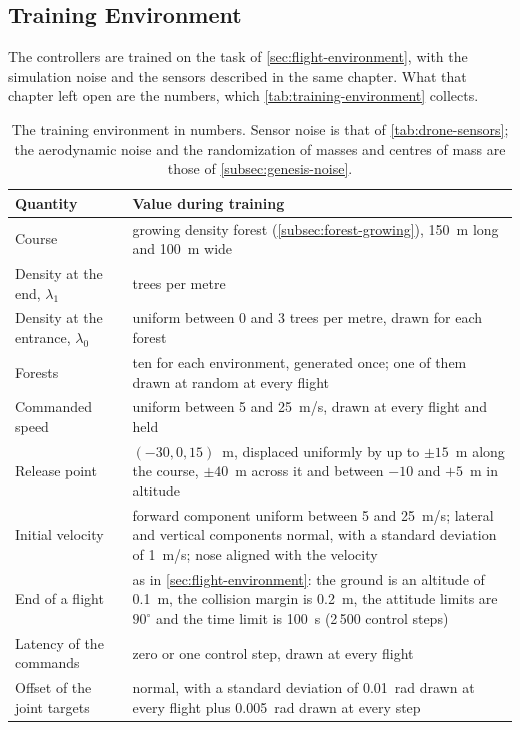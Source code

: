 \subsection{Training Environment}
\label{subsec:training-environment}

The controllers are trained on the task of \autoref{sec:flight-environment}, with the simulation noise and the sensors described in the same chapter. What that chapter left open are the numbers, which \autoref{tab:training-environment} collects.

\begin{table}[htbp]
\centering
\begin{tabularx}{\textwidth}{>{\raggedright\arraybackslash}p{4.6cm} >{\raggedright\arraybackslash}X}
\hline
Quantity & Value during training \\
\hline
Course & growing density forest (\autoref{subsec:forest-growing}), 150~m long and 100~m wide \\
Density at the end, $\lambda_1$ & 4 trees per metre \\
Density at the entrance, $\lambda_0$ & uniform between 0 and 3 trees per metre, drawn for each forest \\
Forests & ten for each environment, generated once; one of them drawn at random at every flight \\
Commanded speed & uniform between 5 and 25~m/s, drawn at every flight and held \\
Release point & $(-30, 0, 15)$~m, displaced uniformly by up to $\pm 15$~m along the course, $\pm 40$~m across it and between $-10$ and $+5$~m in altitude \\
Initial velocity & forward component uniform between 5 and 25~m/s; lateral and vertical components normal, with a standard deviation of 1~m/s; nose aligned with the velocity \\
End of a flight & as in \autoref{sec:flight-environment}: the ground is an altitude of 0.1~m, the collision margin is 0.2~m, the attitude limits are $90^{\circ}$ and the time limit is 100~s (2\,500 control steps) \\
Latency of the commands & zero or one control step, drawn at every flight \\
Offset of the joint targets & normal, with a standard deviation of 0.01~rad drawn at every flight plus 0.005~rad drawn at every step \\
\hline
\end{tabularx}
\caption[The training environment in numbers]{The training environment in numbers. Sensor noise is that of \autoref{tab:drone-sensors}; the aerodynamic noise and the randomization of masses and centres of mass are those of \autoref{subsec:genesis-noise}.}
\label{tab:training-environment}
\end{table}

